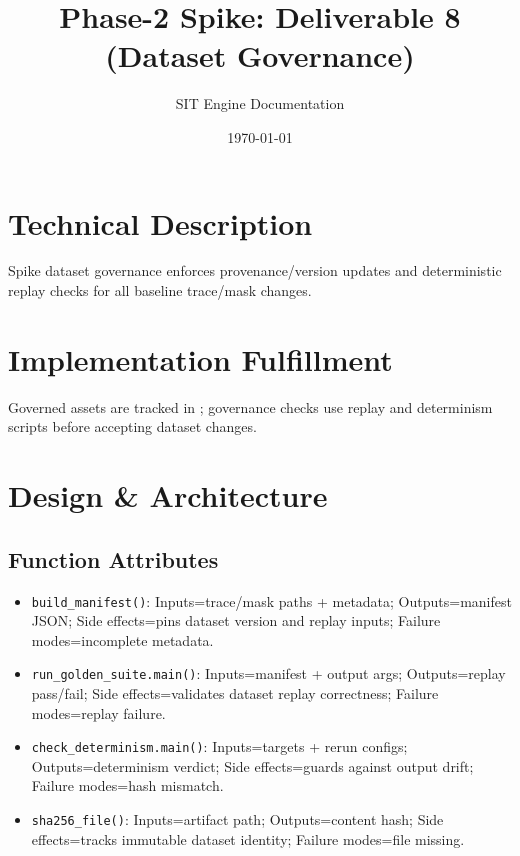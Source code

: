 \documentclass[11pt,a4paper]{article}
\title{Phase-2 Spike: Deliverable 8 (Dataset Governance)}
\author{SIT Engine Documentation}
\date{\today}
\newcommand{\codepath}[1]{\path{#1}}
\begin{document}
\maketitle

\section{Technical Description}
Spike dataset governance enforces provenance/version updates and deterministic replay checks for all baseline trace/mask changes.

\section{Implementation Fulfillment}
Governed assets are tracked in \codepath{Phase-2/datasets/}; governance checks use replay and determinism scripts before accepting dataset changes.

\section{Design \& Architecture}
\subsection*{Function Attributes}
\begin{itemize}[leftmargin=*]
  \item \texttt{build\_manifest()}: Inputs=trace/mask paths + metadata; Outputs=manifest JSON; Side effects=pins dataset version and replay inputs; Failure modes=incomplete metadata.
  \item \texttt{run\_golden\_suite.main()}: Inputs=manifest + output args; Outputs=replay pass/fail; Side effects=validates dataset replay correctness; Failure modes=replay failure.
  \item \texttt{check\_determinism.main()}: Inputs=targets + rerun configs; Outputs=determinism verdict; Side effects=guards against output drift; Failure modes=hash mismatch.
  \item \texttt{sha256\_file()}: Inputs=artifact path; Outputs=content hash; Side effects=tracks immutable dataset identity; Failure modes=file missing.
\end{itemize}
\end{document}
